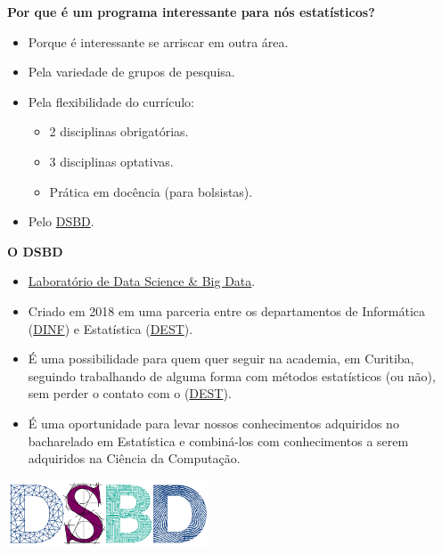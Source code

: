 \documentclass[10pt,
  aspectratio=169,
  serif,
  mathserif,
  professionalfont,
  compress,
  handout,
  ]{beamer}\usepackage[]{graphicx}\usepackage[]{color}
\begin{document}
\begin{frame}[c, allowframebreaks]

\textbf{Por que é um programa interessante para nós estatísticos?}

  \begin{itemize}

  \item Porque é interessante se arriscar em outra área.

  \item Pela variedade de grupos de pesquisa.
  
  \item Pela flexibilidade do currículo:
  
  \begin{itemize}
    \item 2 disciplinas obrigatórias.
    \item 3 disciplinas optativas.
    \item Prática em docência (para bolsistas).
    
  \end{itemize}
  
  \item Pelo \href{https://web.inf.ufpr.br/dsbd/}{DSBD}.
  
  \end{itemize}

\end{frame}

\begin{frame}[c, allowframebreaks]

\textbf{O DSBD}

  \begin{itemize}

  \item \href{https://web.inf.ufpr.br/dsbd/}{Laboratório de Data Science \& Big Data}.

  \item Criado em 2018 em uma parceria entre os departamentos de Informática (\href{https://web.inf.ufpr.br/dinf/}{DINF}) e Estatística (\href{http://www.est.ufpr.br/}{DEST}).
  
  \item É uma possibilidade para quem quer seguir na academia, em Curitiba, seguindo trabalhando de alguma forma com métodos estatísticos (ou não), sem perder o contato com o (\href{http://www.est.ufpr.br/}{DEST}). 
  
  \item É uma oportunidade para levar nossos conhecimentos adquiridos no bacharelado em Estatística e combiná-los com conhecimentos a serem adquiridos na Ciência da Computação.
  
  \end{itemize}

\begin{center}  
  \includegraphics[width=6cm]{img/dsbd1x4.png}  
\end{center}

\end{frame}
\end{document}
